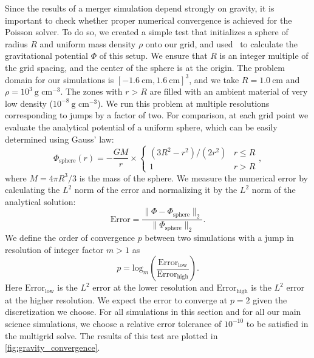 \documentclass[12pt]{article}
\begin{document}
Since the results of a merger simulation depend strongly on gravity,
it is important to check whether proper numerical convergence is
achieved for the Poisson solver. To do so, we created a simple test
that initializes a sphere of radius $R$ and uniform mass density $\rho$
onto our grid, and used \castro\ to calculate the gravitational
potential $\Phi$ of this setup. We ensure that $R$ is an integer
multiple of the grid spacing, and the center of the sphere is at the
origin. The problem domain for our simulations is $[-1.6\ \text{cm}, 1.6\ \text{cm}]^3$, and
we take $R = 1.0\ \text{cm}$ and $\rho = 10^3\ \text{g cm}^{-3}$. 
The zones with $r > R$ are filled with an ambient material of very low density 
($10^{-8}\ \text{g cm}^{-3}$). We run this problem at multiple 
resolutions corresponding to jumps by a factor of two. For
comparison, at each grid point we evaluate the analytical potential of
a uniform sphere, which can be easily determined using Gauss' law:
\begin{equation}
  \Phi_{\text{sphere}}(r) = -\frac{GM}{r} \times \begin{cases} (3R^2 - r^2)/(2 r^2) & r \leq R \\ 1 & r > R \end{cases},\label{eq:sphere-analytical}
\end{equation}
where $M = 4\pi R^3 / 3$ is the mass of the sphere. We measure the 
numerical error by calculating the $L^2$ norm of the error and 
normalizing it by the $L^2$ norm of the analytical solution:
\begin{equation}
  \text{Error} = \frac{\|\Phi - \Phi_{\text{sphere}}\|_2}{\|\Phi_{\text{sphere}}\|_2}.
\end{equation}
We define the order of convergence $p$ between two simulations with a jump 
in resolution of integer factor $m > 1$ as
\begin{equation}
  p = \text{log}_{m}\left(\frac{\text{Error}_{\text{low}}}{\text{Error}_{\text{high}}}\right).
\end{equation}
Here $\text{Error}_{\text{low}}$ is the $L^2$ error at the lower resolution 
and $\text{Error}_{\text{high}}$ is the $L^2$ error at the higher resolution.
We expect the error to converge at $p = 2$ given the discretization we choose. 
For all simulations in this section and for all our main science simulations,
we choose a relative error tolerance of $10^{-10}$ to be satisfied in the multigrid solve.
The results of this test are plotted in \autoref{fig:gravity_convergence}. 
\end{document}
